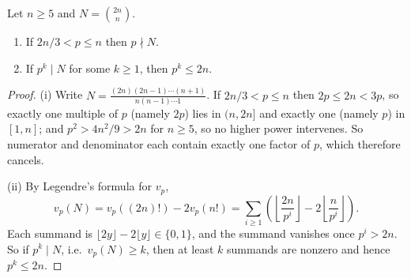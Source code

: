 \begin{lemma}\label{lem:binom}
	Let $n \geq 5$ and $N = \binom{2n}n$.
	\begin{enumerate}[label=(\roman*)]
		\item If $2n/3 < p \leq n$ then $p \nmid N$.
		\item If $p^k \mid N$ for some $k \geq 1$, then $p^k \leq 2n$.
	\end{enumerate}
\end{lemma}
\begin{proof}
	(i) Write $N = \frac{(2n)(2n-1)\cdots(n+1)}{n(n-1)\cdots1}$. If $2n/3 < p \leq n$ then $2p \leq 2n < 3p$, so exactly one multiple of $p$ (namely $2p$) lies in $(n, 2n]$ and exactly one (namely $p$) in $[1,n]$; and $p^2 > 4n^2/9 > 2n$ for $n \geq 5$, so no higher power intervenes. So numerator and denominator each contain exactly one factor of $p$, which therefore cancels.

	(ii) By Legendre's formula for $v_p$,
	$$
	v_p(N) = v_p((2n)!) - 2v_p(n!) = \sum_{i \geq 1}\left(\left\lfloor\frac{2n}{p^i}\right\rfloor - 2\left\lfloor\frac n{p^i}\right\rfloor\right).
	$$
	Each summand is $\lfloor 2y \rfloor - 2\lfloor y\rfloor \in \{0, 1\}$, and the summand vanishes once $p^i > 2n$. So if $p^k \mid N$, i.e.\ $v_p(N) \geq k$, then at least $k$ summands are nonzero and hence $p^k \leq 2n$.
\end{proof}

